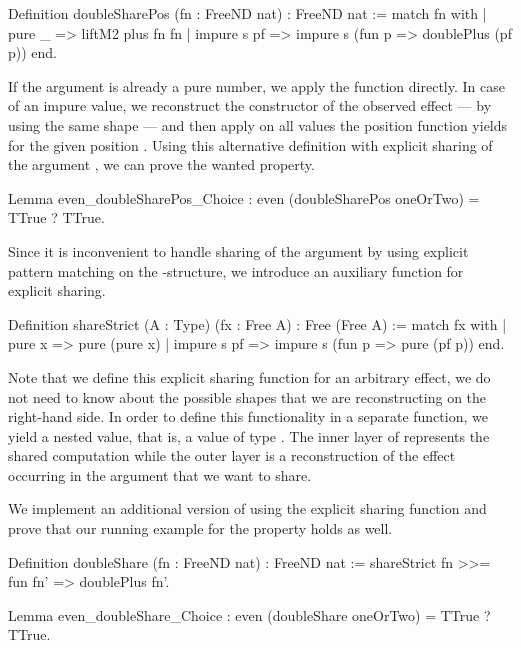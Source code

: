 \begin{coqcode}
Definition doubleSharePos (fn : FreeND nat) : FreeND nat :=
  match fn with
  | pure _      => liftM2 plus fn fn
  | impure s pf => impure s (fun p => doublePlus (pf p))
 end.
\end{coqcode}

If the argument  is already a pure number, we apply the function  directly.
In case of an impure value, we reconstruct the constructor of the observed effect --- by using the same shape  --- and then apply  on all values the position function  yields for the given position .
Using this alternative definition with explicit sharing of the argument , we can prove the wanted property.

\begin{coqcode}
Lemma even_doubleSharePos_Choice :
  even (doubleSharePos oneOrTwo) = TTrue ? TTrue.
\end{coqcode}

Since it is inconvenient to handle sharing of the argument  by using explicit pattern matching on the \--structure, we introduce an auxiliary function for explicit sharing.

\begin{coqcode}
Definition shareStrict (A : Type) (fx : Free A) : Free (Free A) :=
  match fx with
  | pure x      => pure (pure x)
  | impure s pf => impure s (fun p => pure (pf p))
  end.
\end{coqcode}

Note that we define this explicit sharing function for an arbitrary effect, we do not need to know about the possible shapes that we are reconstructing on the right\--hand side.
In order to define this functionality in a separate function, we yield a nested value, that is, a value of type .
The inner layer of  represents the shared computation while the outer layer is a reconstruction of the effect occurring in the argument  that we want to share.

We implement an additional version of  using the explicit sharing function and prove that our running example for the property holds as well.

\begin{coqcode}
Definition doubleShare (fn : FreeND nat) : FreeND nat :=
  shareStrict fn >>= fun fn' => doublePlus fn'.

Lemma even_doubleShare_Choice :
  even (doubleShare oneOrTwo) = TTrue ? TTrue.
\end{coqcode}


